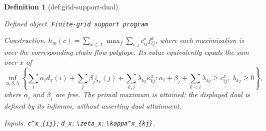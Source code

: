 \documentclass{article}
\newtheorem{definition}{Definition}
\begin{document}
\begin{definition}[def:grid-support-dual]\label{def:grid-support-dual}
\par\smallskip\noindent\emph{Defined object.} \texttt{Finite-\allowbreak{}grid support program}
\par\smallskip\noindent\emph{Construction.} \(h_m(c)=\sum_{x\in\mathcal X}\max_f\sum_{i,j}c^x_{ij}f^x_{ij}\), where each maximization is over the corresponding chain-flow polytope.  Its value equivalently equals the sum over \(x\) of
\[
\inf_{\alpha,\beta,\lambda}
\left\{\sum_i\alpha_i d_x(i)+\sum_j\beta_j\zeta_x(j)+\sum_{k,j}\lambda_{kj}\kappa^x_{kj}:
\alpha_i+\beta_j+\sum_{k<i}\lambda_{kj}\geq c^x_{ij},\ \lambda_{kj}\geq0\right\},
\]
where \(\alpha_i\) and \(\beta_j\) are free.  The primal maximum is attained; the displayed dual is defined by its infimum, without asserting dual attainment.
\par\smallskip\noindent\emph{Inputs.} \texttt{c\textasciicircum{}x\_\allowbreak{}\{ij\}\allowbreak{}}; \texttt{d\_\allowbreak{}x}; \texttt{\textbackslash{}\allowbreak{}zeta\_\allowbreak{}x}; \texttt{\textbackslash{}\allowbreak{}kappa\textasciicircum{}x\_\allowbreak{}\{kj\}\allowbreak{}}.
\end{definition}
\end{document}
